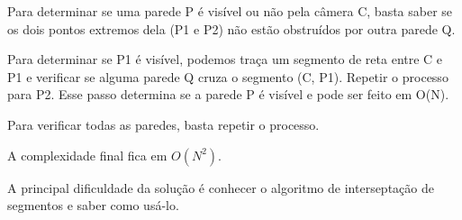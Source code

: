 Para determinar se uma parede P é visível ou não pela câmera C, basta saber se os dois pontos extremos dela (P1 e P2) não estão obstruídos por outra parede Q.

Para determinar se P1 é visível, podemos traça um segmento de reta entre C e P1 e verificar se alguma parede Q cruza o segmento (C, P1).
Repetir o processo para P2.
Esse passo determina se a parede P é visível e pode ser feito em O(N).

Para verificar todas as paredes, basta repetir o processo.

A complexidade final fica em $O(N^2)$.


A principal dificuldade da solução é conhecer o algoritmo de interseptação de segmentos e saber como usá-lo.
